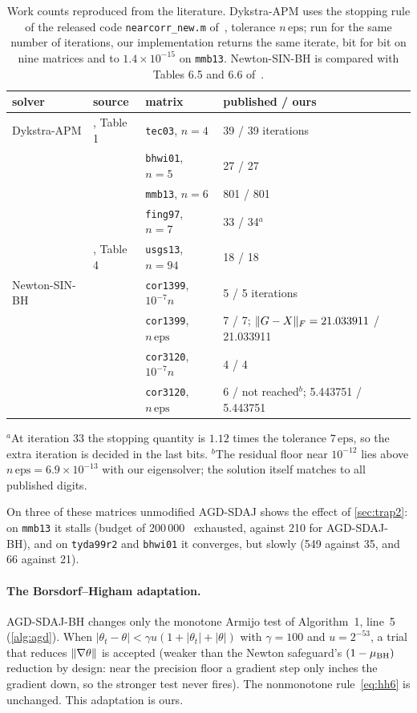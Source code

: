 \begin{table}[h]
\centering
\caption{Work counts reproduced from the literature. Dykstra-APM uses the
stopping rule of the released code \texttt{nearcorr\_new.m}
of~\cite{higham2016anderson}, tolerance $n\,\mathrm{eps}$; run for the same
number of iterations, our implementation returns the same iterate, bit for
bit on nine matrices and to $1.4\times10^{-15}$ on \texttt{mmb13}. Newton-SIN-BH is compared with Tables 6.5 and 6.6
of~\cite{borsdorf2007newton}.}
\label{tab:external}
\small
\begin{tabular}{llll}
\toprule
solver & source & matrix & published / ours\\
\midrule
Dykstra-APM & \cite{higham2016anderson}, Table 1 & \texttt{tec03}, $n=4$ & 39 / 39 iterations\\
            & & \texttt{bhwi01}, $n=5$ & 27 / 27\\
            & & \texttt{mmb13}, $n=6$ & 801 / 801\\
            & & \texttt{fing97}, $n=7$ & 33 / 34$^{a}$\\
            & \cite{higham2016anderson}, Table 4 & \texttt{usgs13}, $n=94$ & 18 / 18\\
\midrule
Newton-SIN-BH & \cite{borsdorf2007newton} & \texttt{cor1399}, $10^{-7}n$ & 5 / 5 iterations\\
              & & \texttt{cor1399}, $n\,\mathrm{eps}$ & 7 / 7; $\lVert G-X\rVert_F=21.033911$ / 21.033911\\
              & & \texttt{cor3120}, $10^{-7}n$ & 4 / 4\\
              & & \texttt{cor3120}, $n\,\mathrm{eps}$ & 6 / not reached$^{b}$; 5.443751 / 5.443751\\
\bottomrule
\end{tabular}
\end{table}
{\small $^{a}$At iteration 33 the stopping quantity is $1.12$ times the
tolerance $7\,\mathrm{eps}$, so the extra iteration is decided in the last
bits. $^{b}$The residual floor near $10^{-12}$ lies above
$n\,\mathrm{eps}=6.9\times10^{-13}$ with our eigensolver; the solution itself
matches to all published digits.\par}

On three of these matrices unmodified AGD-SDAJ shows the effect of
\cref{sec:trap2}: on \texttt{mmb13} it stalls (budget of 200\,000 \EVDs\
exhausted, against 210 for AGD-SDAJ-BH), and on \texttt{tyda99r2} and
\texttt{bhwi01} it converges, but slowly (549 against 35, and 66 against 21).

\paragraph{The Borsdorf--Higham adaptation.}
AGD-SDAJ-BH changes only the monotone Armijo test of Algorithm~1, line~5
(\cref{alg:agd}). When
$|\theta_t-\theta|<\gamma u(1+|\theta_t|+|\theta|)$ with $\gamma=100$ and
$u=2^{-53}$, a trial that reduces $\lVert \nabla\theta\rVert$ is accepted (weaker than
the Newton safeguard's $(1-\mu_{\mathrm{BH}})$ reduction by design: near the precision floor
a gradient step only inches the gradient down, so the stronger test never
fires). The
nonmonotone rule~\eqref{eq:hh6} is unchanged. This adaptation is ours.
